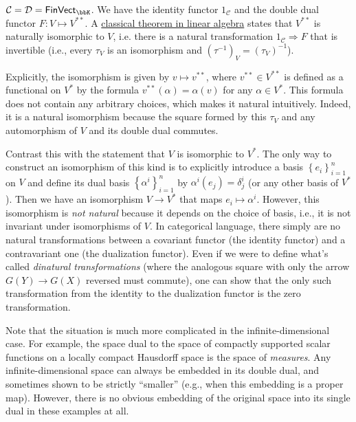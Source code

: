 \begin{example}
    $\mathcal{C}=\mathcal{D}=\mathsf{FinVect}_{\bbK}$. We have the identity
    functor $1_{\mathcal{C}}$ and the double dual functor $F:V\mapsto V^{\ast\ast}$.
    A \href{https://en.wikipedia.org/wiki/Dual_space\#Double_dual}{classical theorem in linear algebra}
    states that $V^{\ast\ast}$ is naturally isomorphic to $V$, i.e.
    there is a natural transformation $1_{\mathcal{C}}\Longrightarrow F$
    that is invertible (i.e., every $\tau_{V}$ is an isomorphism and $\left(\tau^{-1}\right)_{V}=\left(\tau_{V}\right)^{-1}$).

    Explicitly, the isomorphism is given by $v\mapsto v^{\ast\ast}$,
    where $v^{\ast\ast}\in V^{\ast\ast}$ is defined as a functional on
    $V^{\ast}$ by the formula $v^{\ast\ast}\left(\alpha\right)=\alpha\left(v\right)$
    for any $\alpha\in V^{\ast}$. This formula does not contain any arbitrary
    choices, which makes it natural intuitively. Indeed, it is a natural isomorphism because 
    the square formed by this $\tau_V$ and any automorphism of $V$ and its double dual commutes.

    Contrast this with the statement that $V$ is isomorphic to $V^{\ast}$.
    The only way to construct an isomorphism of this kind is to explicitly introduce
    a basis $\left\{ e_{i}\right\} _{i=1}^{n}$ on $V$ and define its
    dual basis $\left\{\alpha^{i}\right\}_{i=1}^{n}$ by $\alpha^{i}\left(e_{j}\right)=\delta_{j}^{i}$ (or any other basis of $V^\ast$).
    Then we have an isomorphism $V\to V^{\ast}$ that maps $e_{i}\mapsto\alpha^{i}$.
    However, this isomorphism is \emph{not natural} because it
    depends on the choice of basis, i.e., it is not invariant under isomorphisms
    of $V$. In categorical language, there simply are no natural transformations between a covariant functor (the identity functor) and a contravariant one (the dualization functor). Even if we were to define what's called \emph{dinatural transformations} (where the analogous square with only the arrow $G(Y)\to G(X)$ reversed must commute), one can show that the only such transformation from the identity to the dualization functor is the zero transformation.

    Note that the situation is much more complicated in the infinite-dimensional case. For example, the space dual to the space of compactly supported scalar functions on a locally compact Hausdorff space is the space of \emph{measures}. Any infinite-dimensional space can always be embedded in its double dual, and sometimes shown to be strictly ``smaller'' (e.g., when this embedding is a proper map). However, there is no obvious embedding of the original space into its single dual in these examples at all.


\end{example}
